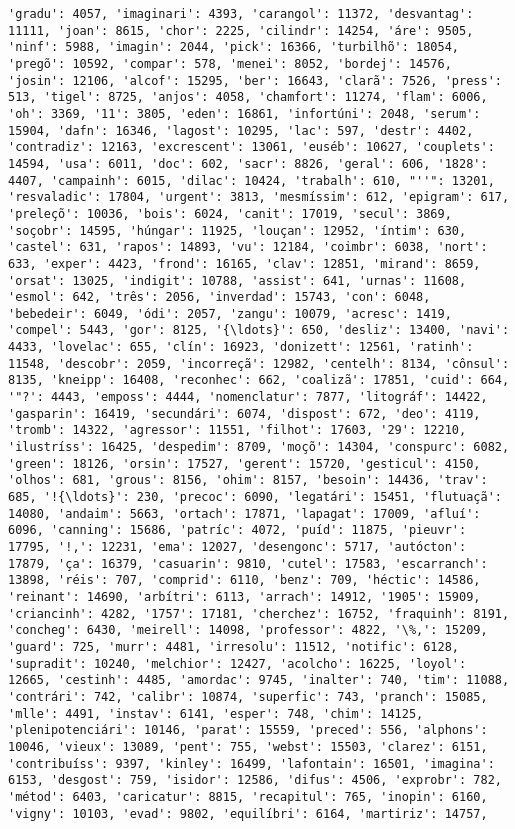 \documentclass[11pt]{article}
\begin{document}
\begin{Verbatim}[commandchars=\\\{\}]
'gradu': 4057, 'imaginari': 4393, 'carangol': 11372, 'desvantag': 11111, 'joan': 8615, 'chor': 2225, 'cilindr': 14254, 'áre': 9505, 'ninf': 5988, 'imagin': 2044, 'pick': 16366, 'turbilhõ': 18054, 'pregõ': 10592, 'compar': 578, 'menei': 8052, 'bordej': 14576, 'josin': 12106, 'alcof': 15295, 'ber': 16643, 'clarã': 7526, 'press': 513, 'tigel': 8725, 'anjos': 4058, 'chamfort': 11274, 'flam': 6006, 'oh': 3369, '11': 3805, 'eden': 16861, 'infortúni': 2048, 'serum': 15904, 'dafn': 16346, 'lagost': 10295, 'lac': 597, 'destr': 4402, 'contradiz': 12163, 'excrescent': 13061, 'euséb': 10627, 'couplets': 14594, 'usa': 6011, 'doc': 602, 'sacr': 8826, 'geral': 606, '1828': 4407, 'campainh': 6015, 'dilac': 10424, 'trabalh': 610, "''": 13201, 'resvaladic': 17804, 'urgent': 3813, 'mesmíssim': 612, 'epigram': 617, 'preleçõ': 10036, 'bois': 6024, 'canit': 17019, 'secul': 3869, 'soçobr': 14595, 'húngar': 11925, 'louçan': 12952, 'íntim': 630, 'castel': 631, 'rapos': 14893, 'vu': 12184, 'coimbr': 6038, 'nort': 633, 'exper': 4423, 'frond': 16165, 'clav': 12851, 'mirand': 8659, 'orsat': 13025, 'indigit': 10788, 'assist': 641, 'urnas': 11608, 'esmol': 642, 'três': 2056, 'inverdad': 15743, 'con': 6048, 'bebedeir': 6049, 'ódi': 2057, 'zangu': 10079, 'acresc': 1419, 'compel': 5443, 'gor': 8125, '{\ldots}': 650, 'desliz': 13400, 'navi': 4433, 'lovelac': 655, 'clín': 16923, 'donizett': 12561, 'ratinh': 11548, 'descobr': 2059, 'incorreçã': 12982, 'centelh': 8134, 'cônsul': 8135, 'kneipp': 16408, 'reconhec': 662, 'coalizã': 17851, 'cuid': 664, '"?': 4443, 'emposs': 4444, 'nomenclatur': 7877, 'litográf': 14422, 'gasparin': 16419, 'secundári': 6074, 'dispost': 672, 'deo': 4119, 'tromb': 14322, 'agressor': 11551, 'filhot': 17603, '29': 12210, 'ilustríss': 16425, 'despedim': 8709, 'moçõ': 14304, 'conspurc': 6082, 'green': 18126, 'orsin': 17527, 'gerent': 15720, 'gesticul': 4150, 'olhos': 681, 'grous': 8156, 'ohim': 8157, 'besoin': 14436, 'trav': 685, '!{\ldots}': 230, 'precoc': 6090, 'legatári': 15451, 'flutuaçã': 14080, 'andaim': 5663, 'ortach': 17871, 'lapagat': 17009, 'afluí': 6096, 'canning': 15686, 'patríc': 4072, 'puíd': 11875, 'pieuvr': 17795, '!,': 12231, 'ema': 12027, 'desengonc': 5717, 'autócton': 17879, 'ça': 16379, 'casuarin': 9810, 'cutel': 17583, 'escarranch': 13898, 'réis': 707, 'comprid': 6110, 'benz': 709, 'héctic': 14586, 'reinant': 14690, 'arbítri': 6113, 'arrach': 14912, '1905': 15909, 'criancinh': 4282, '1757': 17181, 'cherchez': 16752, 'fraquinh': 8191, 'concheg': 6430, 'meirell': 14098, 'professor': 4822, '\%,': 15209, 'guard': 725, 'murr': 4481, 'irresolu': 11512, 'notific': 6128, 'supradit': 10240, 'melchior': 12427, 'acolcho': 16225, 'loyol': 12665, 'cestinh': 4485, 'amordac': 9745, 'inalter': 740, 'tim': 11088, 'contrári': 742, 'calibr': 10874, 'superfic': 743, 'pranch': 15085, 'mlle': 4491, 'instav': 6141, 'esper': 748, 'chim': 14125, 'plenipotenciári': 10146, 'parat': 15559, 'preced': 556, 'alphons': 10046, 'vieux': 13089, 'pent': 755, 'webst': 15503, 'clarez': 6151, 'contribuíss': 9397, 'kinley': 16499, 'lafontain': 16501, 'imagina': 6153, 'desgost': 759, 'isidor': 12586, 'difus': 4506, 'exprobr': 782, 'métod': 6403, 'caricatur': 8815, 'recapitul': 765, 'inopin': 6160, 'vigny': 10103, 'evad': 9802, 'equilíbri': 6164, 'martiriz': 14757, 
\end{Verbatim}
\end{document}
